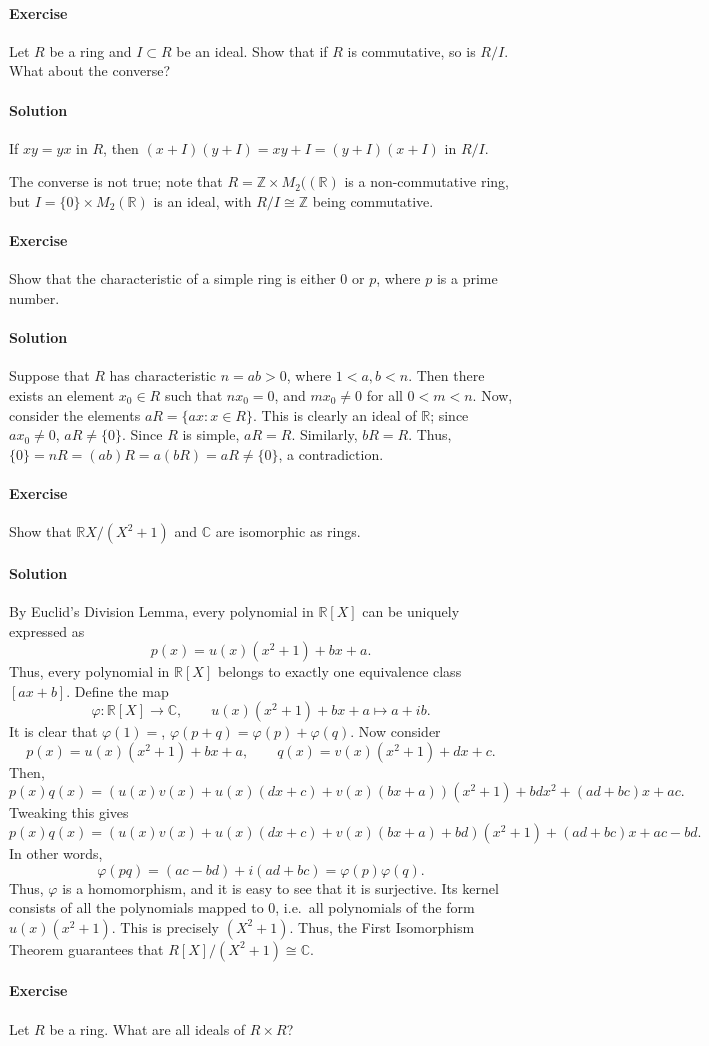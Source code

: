 \documentclass[10pt]{article}
\newcounter{prob}
\newcommand{\problem}{\stepcounter{prob}\paragraph{Exercise \arabic{prob}}}
\newcommand{\solution}{\paragraph{Solution}}
\newcommand{\C}{\mathbb{C}}
\newcommand{\R}{\mathbb{R}}
\newcommand{\Z}{\mathbb{Z}}
\begin{document}
    \problem Let $R$ be a ring and $I \subset R$ be an ideal. Show that if $R$ is
    commutative, so is $R/I$. What about the converse?

    \solution If $xy = yx$ in $R$, then $(x + I)(y + I) = xy + I = (y + I)(x + I)$ in
    $R/I$.

    The converse is not true; note that $R = \Z \times M_2((\R)$ is a non-commutative
    ring, but $I = \{0\} \times M_2(\R)$ is an ideal, with $R/I \cong \Z$ being
    commutative.


    \problem Show that the characteristic of a simple ring is either $0$ or $p$,
    where $p$ is a prime number.

    \solution Suppose that $R$ has characteristic $n = ab > 0$, where $1 < a, b < n$.
    Then there exists an element $x_0 \in R$ such that $nx_0 = 0$, and $mx_0 \neq 0$ for
    all $0 < m < n$. Now, consider the elements $aR = \{ax : x \in R\}$. This is
    clearly an ideal of $\R$; since $ax_0 \neq 0$, $aR \neq \{0\}$. Since $R$ is
    simple, $aR = R$. Similarly, $bR = R$. Thus, $\{0\} = nR = (ab)R = a(bR) = aR
    \neq \{0\}$, a contradiction.


    \problem Show that $\R{X}/(X^2 + 1)$ and $\C$ are isomorphic as rings.

    \solution By Euclid's Division Lemma, every polynomial in $\R[X]$ can be uniquely
    expressed as \[
        p(x) = u(x)(x^2 + 1) + bx + a.
    \] Thus, every polynomial in $\R[X]$ belongs to exactly one equivalence class
    $[ax + b]$. Define the map \[
        \varphi\colon \R[X] \to \C, \qquad u(x)(x^2 + 1) + bx + a \mapsto a + ib.
    \] It is clear that $\varphi(1) = $, $\varphi(p + q) = \varphi(p) + \varphi(q)$.
    Now consider \[
        p(x) = u(x)(x^2 + 1) + bx + a, \qquad
        q(x) = v(x)(x^2 + 1) + dx + c.
    \] Then, \[
        p(x)q(x) = (u(x)v(x) + u(x)(dx + c) + v(x)(bx + a))(x^2 + 1) + bdx^2 + (ad +
        bc)x + ac.
    \] Tweaking this gives \[
        p(x)q(x) = (u(x)v(x) + u(x)(dx + c) + v(x)(bx + a) + bd)(x^2 + 1) + (ad +
        bc)x + ac - bd.
    \] In other words, \[
        \varphi(pq) = (ac - bd) + i(ad + bc) = \varphi(p)\varphi(q).
    \] Thus, $\varphi$ is a homomorphism, and it is easy to see that it is
    surjective. Its kernel consists of all the polynomials mapped to $0$, i.e.\ all
    polynomials of the form $u(x)(x^2 + 1)$. This is precisely $(X^2 + 1)$. Thus, the
    First Isomorphism Theorem guarantees that $R[X]/(X^2 + 1) \cong \C$.


    \problem Let $R$ be a ring. What are all ideals of $R \times R$?
\end{document}
